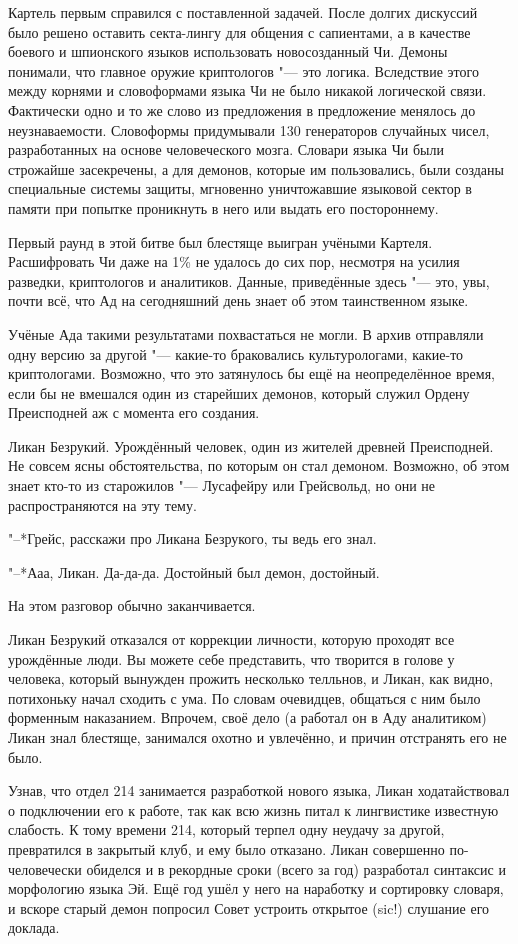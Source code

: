 \documentclass[a4paper,10pt,fleqn]{book}
\begin{document}
Картель первым справился с поставленной задачей.
После долгих дискуссий было решено оставить секта-лингу для общения с сапиентами, а в качестве боевого и шпионского языков использовать новосозданный Чи.
Демоны понимали, что главное оружие криптологов "--- это логика.
Вследствие этого между корнями и словоформами языка Чи не было никакой логической связи.
Фактически одно и то же слово из предложения в предложение менялось до неузнаваемости.
Словоформы придумывали 130 генераторов случайных чисел, разработанных на основе человеческого мозга.
Словари языка Чи были строжайше засекречены, а для демонов, которые им пользовались, были созданы специальные системы защиты, мгновенно уничтожавшие языковой сектор в памяти при попытке проникнуть в него или выдать его постороннему.

Первый раунд в этой битве был блестяще выигран учёными Картеля.
Расшифровать Чи даже на 1\% не удалось до сих пор, несмотря на усилия разведки, криптологов и аналитиков.
Данные, приведённые здесь "--- это, увы, почти всё, что Ад на сегодняшний день знает об этом таинственном языке.

Учёные Ада такими результатами похвастаться не могли.
В архив отправляли одну версию за другой "--- какие-то браковались культурологами, какие-то криптологами.
Возможно, что это затянулось бы ещё на неопределённое время, если бы не вмешался один из старейших демонов, который служил Ордену Преисподней аж с момента его создания.

Ликан Безрукий.
Урождённый человек, один из жителей древней Преисподней.
Не совсем ясны обстоятельства, по которым он стал демоном.
Возможно, об этом знает кто-то из старожилов "--- Лусафейру или Грейсвольд, но они не распространяются на эту тему.

"--*Грейс, расскажи про Ликана Безрукого, ты ведь его знал.

"--*Ааа, Ликан.
Да-да-да.
Достойный был демон, достойный.

На этом разговор обычно заканчивается.

Ликан Безрукий отказался от коррекции личности, которую проходят все урождённые люди.
Вы можете себе представить, что творится в голове у человека, который вынужден прожить несколько телльнов, и Ликан, как видно, потихоньку начал сходить с ума.
По словам очевидцев, общаться с ним было форменным наказанием.
Впрочем, своё дело (а работал он в Аду аналитиком) Ликан знал блестяще, занимался охотно и увлечённо, и причин отстранять его не было.

Узнав, что отдел 214 занимается разработкой нового языка, Ликан ходатайствовал о подключении его к работе, так как всю жизнь питал к лингвистике известную слабость.
К тому времени 214, который терпел одну неудачу за другой, превратился в закрытый клуб, и ему было отказано.
Ликан совершенно по-человечески обиделся и в рекордные сроки (всего за год) разработал синтаксис и морфологию языка Эй.
Ещё год ушёл у него на наработку и сортировку словаря, и вскоре старый демон попросил Совет устроить открытое (sic!) слушание его доклада.
\end{document}
